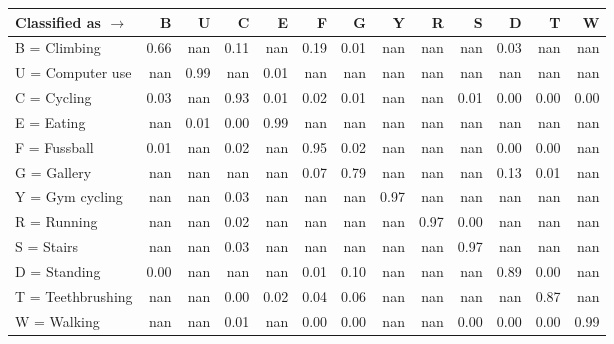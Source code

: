 \begin{tabular}{lrrrrrrrrrrrr}
\toprule
Classified as $\rightarrow$ &    B &    U &    C &    E &    F &    G &    Y &    R &    S &    D &    T &    W \\
\midrule
B = Climbing      & 0.66 &  nan & 0.11 &  nan & 0.19 & 0.01 &  nan &  nan &  nan & 0.03 &  nan &  nan \\
U = Computer use  &  nan & 0.99 &  nan & 0.01 &  nan &  nan &  nan &  nan &  nan &  nan &  nan &  nan \\
C = Cycling       & 0.03 &  nan & 0.93 & 0.01 & 0.02 & 0.01 &  nan &  nan & 0.01 & 0.00 & 0.00 & 0.00 \\
E = Eating        &  nan & 0.01 & 0.00 & 0.99 &  nan &  nan &  nan &  nan &  nan &  nan &  nan &  nan \\
F = Fussball      & 0.01 &  nan & 0.02 &  nan & 0.95 & 0.02 &  nan &  nan &  nan & 0.00 & 0.00 &  nan \\
G = Gallery       &  nan &  nan &  nan &  nan & 0.07 & 0.79 &  nan &  nan &  nan & 0.13 & 0.01 &  nan \\
Y = Gym cycling   &  nan &  nan & 0.03 &  nan &  nan &  nan & 0.97 &  nan &  nan &  nan &  nan &  nan \\
R = Running       &  nan &  nan & 0.02 &  nan &  nan &  nan &  nan & 0.97 & 0.00 &  nan &  nan &  nan \\
S = Stairs        &  nan &  nan & 0.03 &  nan &  nan &  nan &  nan &  nan & 0.97 &  nan &  nan &  nan \\
D = Standing      & 0.00 &  nan &  nan &  nan & 0.01 & 0.10 &  nan &  nan &  nan & 0.89 & 0.00 &  nan \\
T = Teethbrushing &  nan &  nan & 0.00 & 0.02 & 0.04 & 0.06 &  nan &  nan &  nan &  nan & 0.87 &  nan \\
W = Walking       &  nan &  nan & 0.01 &  nan & 0.00 & 0.00 &  nan &  nan & 0.00 & 0.00 & 0.00 & 0.99 \\
\bottomrule
\end{tabular}
